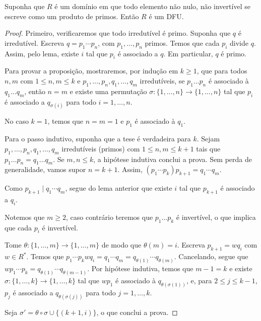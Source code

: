 \begin{prop}
Suponha que $R$ é um domínio em que todo elemento não nulo, não invertível se escreve como um produto de primos.
Então $R$ é um DFU.
\end{prop}
\begin{proof}
    Primeiro, verificaremos que todo irredutível é primo.
    Suponha que $q$ é irredutível.
    Escreva $q=p_1\cdots p_n$, com $p_1, \dots, p_n$ primos.
    Temos que cada $p_i$ divide $q$.
    Assim, pelo lema, existe $i$ tal que $p_i$ é associado a $q$.
    Em particular, $q$ é primo.


    Para provar a proposição, mostraremos, por indução em $k\geq 1$, que para todos $n, m$ com $1\leq n, m\leq k$ e $p_1, \dots, p_n, q_1, \dots, q_m$  irredutíveis, se $p_1\dots p_n$ é associado à $q_1\dots q_m$, então $n=m$ e existe uma permutação $\sigma:\{1, \dots, n\}\rightarrow \{1, \dots, n\}$ tal que $p_i$ é associado a $q_{\sigma(i)}$ para todo $i=1, \dots, n$.

    No caso $k=1$, temos que $n=m=1$ e $p_1$ é associado à $q_1$.

    Para o passo indutivo, suponha que a tese é verdadeira para $k$. Sejam $p_1, \dots, p_{n}, q_1, \dots, q_{m}$ irredutíveis (primos) com $1\leq n, m\leq k+1$ tais que $p_1\dots p_{n}=q_1\dots q_{m}$.
    Se $m, n\leq k$, a hipótese indutiva conclui a prova.
    Sem perda de generalidade, vamos supor $n=k+1$.
    Assim, $(p_1\cdots p_{k})p_{k+1}=q_1\cdots q_{m}$.

    Como $p_{k+1}\mid q_1\cdots q_m$, segue do lema anterior que existe $i$ tal que $p_{k+1}$ é associado a $q_i$.

    Notemos que $m\geq 2$, caso contrário teremos que $p_1\dots p_k$ é invertível, o que implica que cada $p_i$ é invertível.

    Tome $\theta: \{1, \dots, m\}\rightarrow \{1, \dots, m\}$ de modo que  $\theta(m)=i$. Escreva $p_{k+1}=w q_i$ com $w \in R^*$.
    Temos que $p_1\cdots p_{k}w q_i=q_1\cdots q_{m}=q_{\theta(1)}\cdots q_{\theta(m)}$.
    Cancelando, segue que $wp_1\cdots p_{k}=q_{\theta(1)}\cdots q_{\theta(m-1)}$.
    Por hipótese indutiva, temos que $m-1=k$ e existe $\sigma: \{1, \dots, k\}\rightarrow \{1, \dots, k\}$ tal que $wp_1$ é associado à $q_{\theta(\sigma(1))}$, e, para $2\leq j\leq k-1$, $p_j$ é associado a $q_{\theta(\sigma(j))}$ para todo $j=1, \dots, k$.

    Seja $\sigma'=\theta\circ\sigma \cup \{(k+1, i)\}$, o que conclui a prova.
\end{proof}

